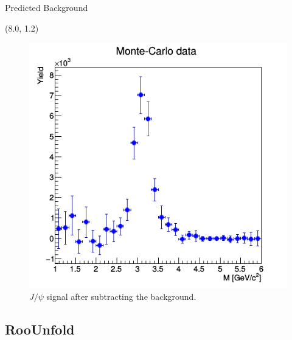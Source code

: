 \documentclass[11pt, xcolor={dvipsnames}, aspectratio = 169]{beamer}
\newcommand{\jpsi}{$J/\psi$ }
\begin{document}
\begin{frame}{Predicted Background}
\begin{textblock}{7.0}(8.0, 1.2)
\begin{figure}
    \centering
    \includegraphics[width = 1.0\linewidth]{imgs/signal_hist000.png}
    \caption{\jpsi signal after subtracting the background.}
\end{figure}
\end{textblock}

\end{frame}

%
%

\subsection{RooUnfold}
\end{document}

